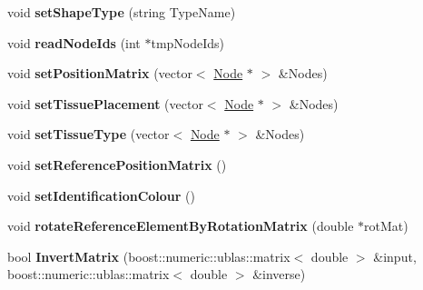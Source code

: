 \begin{DoxyCompactItemize}
\item 
\hypertarget{classShapeBase_a740a379f345d7d8046309313b6903950}{}void {\bfseries set\+Shape\+Type} (string Type\+Name)\label{classShapeBase_a740a379f345d7d8046309313b6903950}

\item 
\hypertarget{classShapeBase_a04859ea938c88369d48fa4e27bcd73f6}{}void {\bfseries read\+Node\+Ids} (int $\ast$tmp\+Node\+Ids)\label{classShapeBase_a04859ea938c88369d48fa4e27bcd73f6}

\item 
\hypertarget{classShapeBase_a93c774ad8de4f6ed3e70d98add1744b1}{}void {\bfseries set\+Position\+Matrix} (vector$<$ \hyperlink{classNode}{Node} $\ast$ $>$ \&Nodes)\label{classShapeBase_a93c774ad8de4f6ed3e70d98add1744b1}

\item 
\hypertarget{classShapeBase_abbffef73b01ff9d09f707c2aba28a1a1}{}void {\bfseries set\+Tissue\+Placement} (vector$<$ \hyperlink{classNode}{Node} $\ast$ $>$ \&Nodes)\label{classShapeBase_abbffef73b01ff9d09f707c2aba28a1a1}

\item 
\hypertarget{classShapeBase_a79d7d67d8b94081ea40c05c1c04a133a}{}void {\bfseries set\+Tissue\+Type} (vector$<$ \hyperlink{classNode}{Node} $\ast$ $>$ \&Nodes)\label{classShapeBase_a79d7d67d8b94081ea40c05c1c04a133a}

\item 
\hypertarget{classShapeBase_aa260269fe9605765f5adb494d1a99737}{}void {\bfseries set\+Reference\+Position\+Matrix} ()\label{classShapeBase_aa260269fe9605765f5adb494d1a99737}

\item 
\hypertarget{classShapeBase_a8dafd8524fe5aa5326173aa49a8f78a0}{}void {\bfseries set\+Identification\+Colour} ()\label{classShapeBase_a8dafd8524fe5aa5326173aa49a8f78a0}

\item 
\hypertarget{classShapeBase_afec65d5b9fd12a8dd8f1b28152f5ee93}{}void {\bfseries rotate\+Reference\+Element\+By\+Rotation\+Matrix} (double $\ast$rot\+Mat)\label{classShapeBase_afec65d5b9fd12a8dd8f1b28152f5ee93}

\item 
\hypertarget{classShapeBase_ab887eaa6a0be56e3b50f549326dbe87a}{}bool {\bfseries Invert\+Matrix} (boost\+::numeric\+::ublas\+::matrix$<$ double $>$ \&input, boost\+::numeric\+::ublas\+::matrix$<$ double $>$ \&inverse)\label{classShapeBase_ab887eaa6a0be56e3b50f549326dbe87a}


\end{DoxyCompactItemize}
